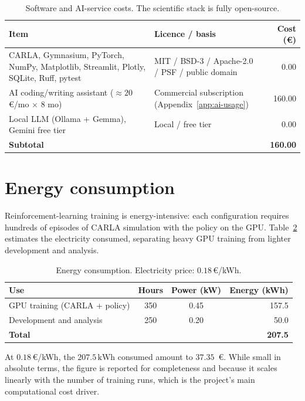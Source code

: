 \begin{table}[H]
  \centering
  \caption{Software and AI-service costs. The scientific stack is fully open-source.}
  \label{tab:software}
  \small
  \begin{tabular}{@{}p{5.8cm}p{5.0cm}r@{}}
    \toprule
    \textbf{Item} & \textbf{Licence / basis} & \textbf{Cost (€)} \\
    \midrule
    CARLA, Gymnasium, PyTorch, NumPy, Matplotlib, Streamlit, Plotly, SQLite, Ruff, pytest
      & MIT / BSD-3 / Apache-2.0 / PSF / public domain & 0.00 \\
    AI coding/writing assistant (\(\approx 20\)\,€/mo \(\times\) 8 mo)
      & Commercial subscription (Appendix~\ref{app:ai-usage}) & 160.00 \\
    Local LLM (Ollama + Gemma), Gemini free tier
      & Local / free tier & 0.00 \\
    \midrule
    \textbf{Subtotal} & & \textbf{160.00} \\
    \bottomrule
  \end{tabular}
\end{table}

\section{Energy consumption}\label{sec:budget-energy}

Reinforcement-learning training is energy-intensive: each configuration requires hundreds of
episodes of CARLA simulation with the policy on the GPU. Table~\ref{tab:energy} estimates the
electricity consumed, separating heavy GPU training from lighter development and analysis.

\begin{table}[H]
  \centering
  \caption{Energy consumption. Electricity price: \(0.18\)\,€/kWh.}
  \label{tab:energy}
  \small
  \begin{tabular}{@{}lccr@{}}
    \toprule
    \textbf{Use} & \textbf{Hours} & \textbf{Power (kW)} & \textbf{Energy (kWh)} \\
    \midrule
    GPU training (CARLA + policy) & 350 & 0.45 & 157.5 \\
    Development and analysis      & 250 & 0.20 & 50.0 \\
    \midrule
    \textbf{Total} & & & \textbf{207.5} \\
    \bottomrule
  \end{tabular}
\end{table}

At \(0.18\)\,€/kWh, the \(207.5\,\mathrm{kWh}\) consumed amount to \(37.35\)~€. While small in
absolute terms, the figure is reported for completeness and because it scales linearly with the
number of training runs, which is the project's main computational cost driver.


